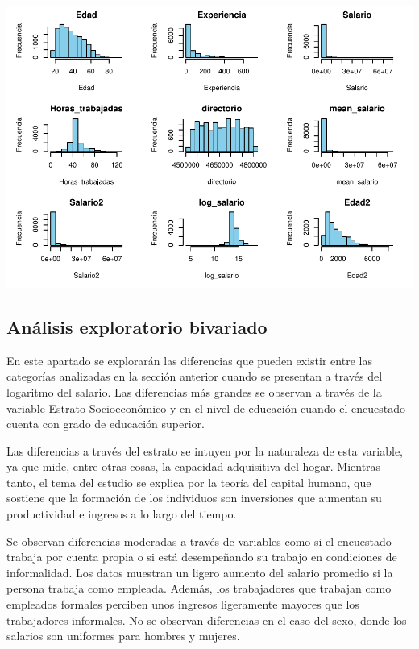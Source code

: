 \documentclass[
]{article}
\begin{document}
\includegraphics{Taller-1_files/figure-latex/unnamed-chunk-14-1.pdf}

\hypertarget{anuxe1lisis-exploratorio-bivariado}{%
\subsection{Análisis exploratorio
bivariado}\label{anuxe1lisis-exploratorio-bivariado}}

\hfill\break
En este apartado se explorarán las diferencias que pueden existir entre
las categorías analizadas en la sección anterior cuando se presentan a
través del logaritmo del salario. Las diferencias más grandes se
observan a través de la variable Estrato Socioeconómico y en el nivel de
educación cuando el encuestado cuenta con grado de educación superior.

Las diferencias a través del estrato se intuyen por la naturaleza de
esta variable, ya que mide, entre otras cosas, la capacidad adquisitiva
del hogar. Mientras tanto, el tema del estudio se explica por la teoría
del capital humano, que sostiene que la formación de los individuos son
inversiones que aumentan su productividad e ingresos a lo largo del
tiempo.

Se observan diferencias moderadas a través de variables como si el
encuestado trabaja por cuenta propia o si está desempeñando su trabajo
en condiciones de informalidad. Los datos muestran un ligero aumento del
salario promedio si la persona trabaja como empleada. Además, los
trabajadores que trabajan como empleados formales perciben unos ingresos
ligeramente mayores que los trabajadores informales. No se observan
diferencias en el caso del sexo, donde los salarios son uniformes para
hombres y mujeres.
\end{document}
